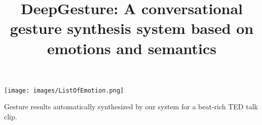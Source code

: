 \documentclass[sigconf]{acmart}
\begin{document}
\title{DeepGesture: A conversational gesture synthesis system based on emotions and semantics}









\begin{teaserfigure}
	\centering
  \texttt{[image: images/ListOfEmotion.png]}
  \caption{Gesture results automatically synthesized by our system for a beat-rich TED talk clip.}
  \label{fig:teaser}
\end{teaserfigure}

\maketitle



%
%
%
%
%
%







\end{document}
